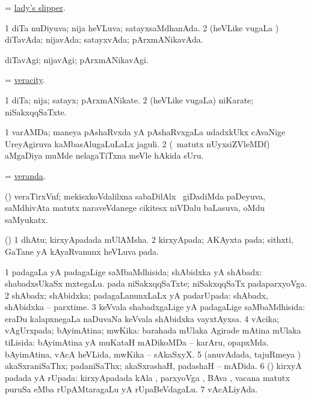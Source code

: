 \bentry
{}
\gl{\nA}
\expl{}
\bmng
 = \hyperref{kandict_l.pdf}{L}{lady's slipper}{lady's slipper}. 
\emng
\eentry

\bentry
{} 
\gl{\gu}
\expl{}
\bmng
\bnum
\num{1} diTa nuDiyuva; nija heVLuva; satayxsaMdhanAda. 
\num{2} (heVLike \mo vugaLa \vi) diTavAda; nijavAda; satayxvAda; pArxmANikavAda. 
\enum
\emng
\eentry

\bentry
{} 
\gl{\kirxvi}
\expl{}
\bmng
 diTavAgi; nijavAgi; pArxmANikavAgi. 
\emng
\eentry

\bentry
{} 
\gl{\nA}
\expl{}
\bmng
 = \hyperlink{veracity}{veracity}. 
\emng
\eentry

\bentry
{} 
\gl{\nA}
\expl{}
\bmng
\bnum
\num{1} diTa; nija; satayx; pArxmANikate. 
\num{2} (heVLike \mo vugaLa) niKarate; niSakxqqSaTxte. 
\enum
\emng
\eentry

\bentry
{} 
\gl{\nA}
\expl{}
\bmng
\bnum
\num{1} varAMDa; maneya pAshaRvxda yA pAshaRvxgaLa udadxkUkx cAvaNige UreyAgiruva kaMbasAlugaLuLaLx jaguli. 
\num{2} (\AseTxrXV\ matutx nUyxsiZVleMDf) aMgaDiya muMde nelagaTiTxna meVle hAkida sUru. 
\enum
\emng
\eentry

\bentry
{} 
\gl{\nA}
\expl{}
\bmng
 = \hyperlink{veranda}{veranda}. 
\emng
\eentry

\bentry
{} 
\gl{\nA}
\expl{}
\bmng
 (\veYshA) veraTirxVnf; mekisxkoVdalilxna sabaDilAlx  \mo\ giDadiMda paDeyuva, saMdhivAta matutx naraveVdanege cikitesx niVDalu baLasuva, oMdu saMyukatx. 
\emng
\eentry

\bentry
{} 
\gl{\nA}
\expl{}
\bmng
 (\vAyx) 
\bnum
\num{1} dhAtu; kirxyApadada mUlAMsha. 
\num{2} kirxyApada; AKAyxta pada; sithxti, GaTane yA kAyaRvanunx heVLuva pada. 
\enum
\emng
\eentry

\bentry
{} 
\gl{\gu}
\expl{}
\bmng
\bnum
\num{1} padagaLa yA padagaLige saMbaMdhisida; shAbidxka yA shAbadx:  shabadxsUkaSx mxtegaLu.  pada niSakxqqSaTxte; niSakxqqSaTx padaparxyoVga. 
\num{2} shAbadx; shAbidxka; padagaLanunxLaLx yA padarUpada:  shAbadx, shAbidxka -- parxtime. 
\num{3} keVvala shabadxgaLige yA padagaLige saMbaMdhisida:  eraDu kalapxnegaLa naDuvaNa keVvala shAbidxka vayxtAyxsa. 
\num{4} vAcika; vAgUrxpada; bAyimAtina; mwKika: barahada mUlaka Agirade mAtina mUlaka tiLisida:  bAyimAtina yA muKataH mADikoMDa -- karAru, opapxMda.  bAyimAtina, vAcA heVLida, mwKika -- sAkaSxyX. 
\num{5} (anuvAdada, tajuRmeya \vi) akaSxraniSaThx; padaniSaThx; akaSxrashaH, padashaH -- mADida. 
\num{6} (\vAyx) kirxyA padada yA rUpada:  kirxyApadada kAla , parxyoVga , BAva , vacana  matutx puruSa  eMba rUpAMtaragaLu yA rUpaBeVdagaLu. 
\num{7} vAcALiyAda. 
\enum
\emng
\eentry

